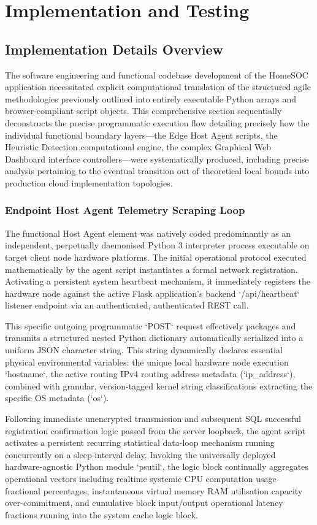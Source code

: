 \chapter{Implementation and Testing}

\section{Implementation Details Overview}
The software engineering and functional codebase development of the HomeSOC application necessitated explicit computational translation of the structured agile methodologies previously outlined into entirely executable Python arrays and browser-compliant script objects. This comprehensive section sequentially deconstructs the precise programmatic execution flow detailing precisely how the individual functional boundary layers—the Edge Host Agent scripts, the Heuristic Detection computational engine, the complex Graphical Web Dashboard interface controllers—were systematically produced, including precise analysis pertaining to the eventual transition out of theoretical local bounds into production cloud implementation topologies.

\subsection{Endpoint Host Agent Telemetry Scraping Loop}
The functional Host Agent element was natively coded predominantly as an independent, perpetually daemonised Python 3 interpreter process executable on target client node hardware platforms. The initial operational protocol executed mathematically by the agent script instantiates a formal network registration. Activating a persistent system heartbeat mechanism, it immediately registers the hardware node against the active Flask application's backend `/api/heartbeat` listener endpoint via an authenticated, authenticated REST call. 

This specific outgoing programmatic `POST` request effectively packages and transmits a structured nested Python dictionary automatically serialized into a uniform JSON character string. This string dynamically declares essential physical environmental variables: the unique local hardware node execution `hostname`, the active routing IPv4 routing address metadata (`ip\_address`), combined with granular, version-tagged kernel string classifications extracting the specific OS metadata (`os`).  

Following immediate unencrypted transmission and subsequent SQL successful registration confirmation logic passed from the server loopback, the agent script activates a persistent recurring statistical data-loop mechanism running concurrently on a sleep-interval delay. Invoking the universally deployed hardware-agnostic Python module `psutil`, the logic block continually aggregates operational vectors including realtime systemic CPU computation usage fractional percentages, instantaneous virtual memory RAM utilisation capacity over-commitment, and cumulative block input/output operational latency fractions running into the system cache logic block. 

